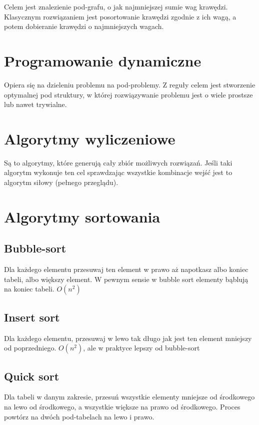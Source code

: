 \documentclass{../notatki}
\begin{document}
Celem jest znalezienie pod-grafu, o jak najmniejszej sumie wag krawędzi.
Klasycznym rozwiązaniem jest posortowanie krawędzi zgodnie z ich wagą, a potem
dobieranie krawędzi o najmniejszych wagach.

\section{Programowanie dynamiczne}

Opiera się na dzieleniu problemu na pod-problemy. Z reguły celem jest stworzenie
optymalnej pod struktury, w której rozwiązywanie problemu jest o wiele prostsze
lub nawet trywialne.

\section{Algorytmy wyliczeniowe}

Są to algorytmy, które generują cały zbiór możliwych rozwiązań. Jeśli
taki algorytm
wykonuje ten cel sprawdzając wszystkie kombinacje wejść jest to algorytm siłowy
(pełnego przeglądu).

\section{Algorytmy sortowania}

\subsection{Bubble-sort}

Dla każdego elementu przesuwaj ten element w prawo aż napotkasz albo
koniec tabeli, albo większy element. W pewnym sensie w bubble sort elementy
bąblują na koniec tabeli. $O(n^2)$

\subsection{Insert sort}

Dla każdego elementu, przesuwaj w lewo tak długo jak jest ten element
mniejszy od poprzedniego. $O(n^2)$, ale w praktyce lepszy od bubble-sort

\subsection{Quick sort}

Dla tabeli w danym zakresie, przesuń wszystkie elementy mniejsze od środkowego
na lewo od środkowego, a wszystkie większe na prawo od środkowego. Proces
powtórz na dwóch pod-tabelach na lewo i prawo.
\end{document}
